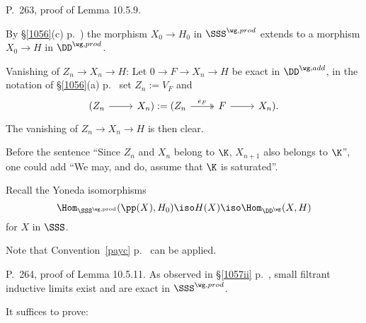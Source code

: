 \documentclass[12pt]{article}
\theoremstyle{remark}
\theoremstyle{definition}
\begin{document}
\begin{s} P.~263, proof of Lemma 10.5.9.

By \S\ref{1056}(c) p.~) the morphism $X_0\to H_0$ in $\SSS^{\wg,prod}$ extends to a morphism $X_0\to H$ in $\DD^{\wg,prod}$.

Vanishing of $Z_n\to X_n\to H$: Let $0\to F\to X_n\to H$ be exact in $\DD^{\wg,add}$, in the notation of \S\ref{1056}(a) p.~ set $Z_n:=V_F$ and 
$$
\begin{tikzcd}
(Z_n\ar[r]&X_n):=(Z_n\ar[r,"e_F",twoheadrightarrow]&F\ar[r]&X_n).
\end{tikzcd}
$$
The vanishing of $Z_n\to X_n\to H$ is then clear.

Before the sentence ``Since $Z_n$ and $X_n$ belong to $\K$, $X_{n+1}$ also belongs to $\K$'', one could add ``We may, and do, assume that $\K$ is saturated''.

Recall the Yoneda isomorphisms 
$$
\Hom_{\SSS^{\wg,\text{prod}}}(\pp(X),H_0)\iso H(X)\iso\Hom_{\DD^\wg}(X,H)
$$ 
for $X$ in $\SSS$.

Note that Convention~\ref{payc} p.~ can be applied.
\end{s}


\begin{s}
P.~264, proof of Lemma 10.5.11. As observed in \S\ref{1057ii} p.~, small filtrant inductive limits exist and are exact in $\SSS^{\wg,prod}$.
\end{s}



It suffices to prove:
\end{document}
